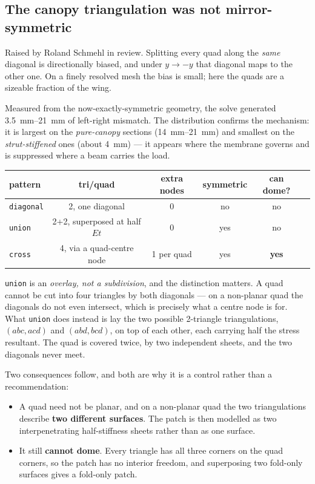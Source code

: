 \documentclass[11pt,a4paper]{article}
\newcommand{\code}[1]{\texttt{\small #1}}
\begin{document}
\subsection{The canopy triangulation was not mirror-symmetric}

Raised by Roland Schmehl in review. Splitting every quad along the \emph{same}
diagonal is directionally biased, and under $y \to -y$ that diagonal maps to the
other one. On a finely resolved mesh the bias is small; here the quads are a
sizeable fraction of the wing.

Measured from the now-exactly-symmetric geometry, the solve generated
\SIrange{3.5}{21}{\milli\metre} of left-right mismatch. The distribution
confirms the mechanism: it is largest on the \emph{pure-canopy} sections
(\SIrange{14}{21}{\milli\metre}) and smallest on the \emph{strut-stiffened} ones
(about \SI{4}{\milli\metre}) --- it appears where the membrane governs and is
suppressed where a beam carries the load.

\begin{center}\small
\begin{tabular}{@{}lccccc@{}}
\toprule
\textbf{pattern} & \textbf{tri/quad} & \textbf{extra nodes} &
\textbf{symmetric} & \textbf{can dome?} \\
\midrule
\code{diagonal} & 2, one diagonal & 0 & no & no \\
\code{union} & 2+2, superposed at half $Et$ & 0 & yes & no \\
\code{cross} & 4, via a quad-centre node & 1 per quad & yes & \textbf{yes} \\
\bottomrule
\end{tabular}
\end{center}

\code{union} is an \emph{overlay, not a subdivision}, and the distinction
matters. A quad cannot be cut into four triangles by both diagonals --- on a
non-planar quad the diagonals do not even intersect, which is precisely what a
centre node is for. What \code{union} does instead is lay the two possible
2-triangle triangulations, $(abc, acd)$ and $(abd, bcd)$, on top of each other,
each carrying half the stress resultant. The quad is covered twice, by two
independent sheets, and the two diagonals never meet.

Two consequences follow, and both are why it is a control rather than a
recommendation:

\begin{itemize}
  \item A quad need not be planar, and on a non-planar quad the two
    triangulations describe \textbf{two different surfaces}. The patch is then
    modelled as two interpenetrating half-stiffness sheets rather than as one
    surface.
  \item It still \textbf{cannot dome}. Every triangle has all three corners on
    the quad corners, so the patch has no interior freedom, and superposing two
    fold-only surfaces gives a fold-only patch.
\end{itemize}
\end{document}
